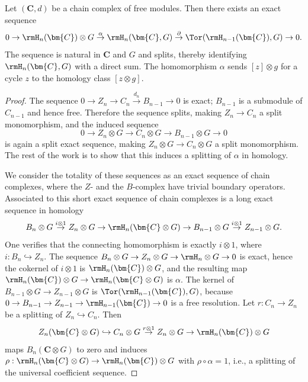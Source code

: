 \begin{prop}\label{prop 11.9.1 tomDieck}
    Let $(\bm{C},d)$ be a chain complex of free modules. Then there exists an exact sequence
    \[0\to \rmH_n(\bm{C})\otimes G\overset{\alpha}{\to}\rmH_n(\bm{C}, G)\overset{\partial}{\to}\Tor(\rmH_{n-1}(\bm{C}),G)\to 0.\]
    The sequence is natural in $\bm{C}$ and $G$ and splits, thereby identifying $\rmH_n(\bm{C},G)$ with a direct sum. The homomorphism $\alpha$ sends $[z]\otimes g$ for a cycle $z$ to the homology class $[z\otimes g]$.
\end{prop}
\begin{proof}
    The sequence $0\to Z_n\to C_n\overset{d_n}{\to}B_{n-1}\to 0$ is exact; $B_{n-1}$ is a submodule of $C_{n-1}$ and hence free. Therefore the sequence splits, making $Z_n\to C_n$ a split monomorphism, and the induced sequence
    \[0\to Z_n\otimes G\to C_n\otimes G\to B_{n-1}\otimes G\to 0\]
    is again a split exact sequence, making $Z_n\otimes G\to C_n\otimes G$ a split monomorphism. The rest of the work is to show that this induces a splitting of $\alpha$ in homology.
    
    We consider the totality of these sequences as an exact sequence of chain complexes, where the $Z$- and the $B$-complex have trivial boundary operators. Associated to this short exact sequence of chain complexes is a long exact sequence in homology
    \[B_n\otimes G\overset{i\otimes 1}{\to} Z_n\otimes G\to \rmH_n(\bm{C}\otimes G)\to B_{n-1}\otimes G\overset{i\otimes 1}{\to }Z_{n-1}\otimes G.\]
    One verifies that the connecting homomorphism is exactly $i\otimes 1$, where $i:B_n\hookrightarrow Z_n$. The sequence $B_n\otimes G\to Z_n\otimes G\to \rmH_n\otimes G\to 0$ is exact, hence the cokernel of $i\otimes 1$ is $\rmH_n(\bm{C})\otimes G$, and the resulting map $\rmH_n(\bm{C})\otimes G\to \rmH_n(\bm{C}\otimes G)$ is $\alpha$. The kernel of $B_{n-1}\otimes G\to Z_{n-1}\otimes G$ is $\Tor(\rmH_{n-1}(\bm{C}),G)$, because $0\to B_{n-1}\to Z_{n-1}\to \rmH_{n-1}(\bm{C})\to 0$ is a free resolution. Let $r:C_n\to Z_n$ be a splitting of $Z_n\hookrightarrow C_n$. Then
    \[Z_n(\bm{C}\otimes G)\hookrightarrow C_n\otimes G\overset{r\otimes 1}{\to}Z_n\otimes G\to \rmH_n(\bm{C})\otimes G\]
    maps $B_n(\bm{C}\otimes G)$ to zero and induces $\rho:\rmH_n(\bm{C}\otimes G)\to \rmH_n(\bm{C})\otimes G$ with $\rho\circ\alpha=1$, i.e., a splitting of the universal coefficient sequence.
\end{proof}


